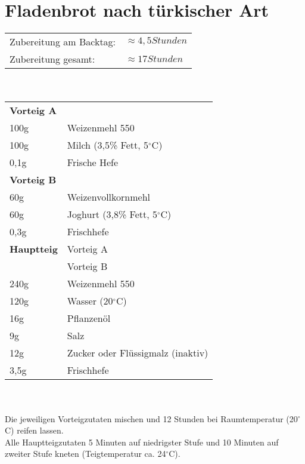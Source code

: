 \section{Fladenbrot nach türkischer Art}
\begin{tabular}{ll}
    Zubereitung am Backtag: & $\approx 4,5 Stunden$ \\
    Zubereitung gesamt:     & $\approx 17 Stunden$
\end{tabular}\\\paragraph*{}
\begin{tabular}{ll}
    \textbf{Vorteig A} \\
    100g & Weizenmehl 550                    \\
    100g & Milch (3,5\% Fett, 5$^\circ$C)    \\
    0,1g & Frische Hefe                      \\
    \textbf{Vorteig B} \\
    60g  & Weizenvollkornmehl                \\
    60g  & Joghurt (3,8\% Fett, 5$^\circ$C)  \\
    0,3g & Frischhefe                        \\
    \textbf{Hauptteig}
    & Vorteig A                         \\
    & Vorteig B                         \\
    240g & Weizenmehl 550                    \\
    120g & Wasser (20$^\circ$C)              \\
    16g  & Pflanzenöl                        \\
    9g   & Salz                              \\
    12g  & Zucker oder Flüssigmalz (inaktiv) \\
    3,5g & Frischhefe                        \\
\end{tabular}\\\paragraph*{}
Die jeweiligen Vorteigzutaten mischen und 12 Stunden bei Raumtemperatur (20$^\circ$C) reifen lassen.\\
Alle Hauptteigzutaten 5 Minuten auf niedrigster Stufe und 10 Minuten auf zweiter Stufe kneten (Teigtemperatur ca. 24$^\circ$C).\\
